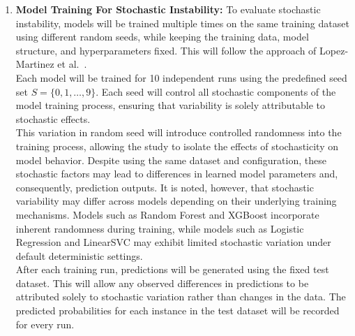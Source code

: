 \documentclass[12pt]{article}
\begin{document}
\begin{enumerate}
  Each model will then be retrained independently on every bootstrapped sample. After training, predictions will be generated using the fixed test dataset and stored in structured CSV files with the filename <model>\_bs\_pred.csv, where each column represents the predicted probabilities from a specific training run. This organized storage will enable direct comparison of predictions across multiple runs for each individual.\\

  By repeating this process across all bootstrapped samples, the study will produce a distribution of predictions for each test instance which will serve as the basis for computing instability metrics in later stages of the methodology.

  \item \textbf{Model Training For Stochastic Instability:}
  To evaluate stochastic instability, models will be trained multiple times on the same training dataset using different random seeds, while keeping the training data, model structure, and hyperparameters fixed. This will follow the approach of Lopez-Martinez et al.~\cite{lopez2022instability}.\\

  Each model will be trained for 10 independent runs using the predefined seed set $S = \{0,1,\dots,9\}$. Each seed will control all stochastic components of the model training process, ensuring that variability is solely attributable to stochastic effects.\\

  This variation in random seed will introduce controlled randomness into the training process, allowing the study to isolate the effects of stochasticity on model behavior. Despite using the same dataset and configuration, these stochastic factors may lead to differences in learned model parameters and, consequently, prediction outputs. It is noted, however, that stochastic variability may differ across models depending on their underlying training mechanisms. Models such as Random Forest and XGBoost incorporate inherent randomness during training, while models such as Logistic Regression and LinearSVC may exhibit limited stochastic variation under default deterministic settings.\\

  After each training run, predictions will be generated using the fixed test dataset. This will allow any observed differences in predictions to be attributed solely to stochastic variation rather than changes in the data. The predicted probabilities for each instance in the test dataset will be recorded for every run. \\


\end{enumerate}
\end{document}
